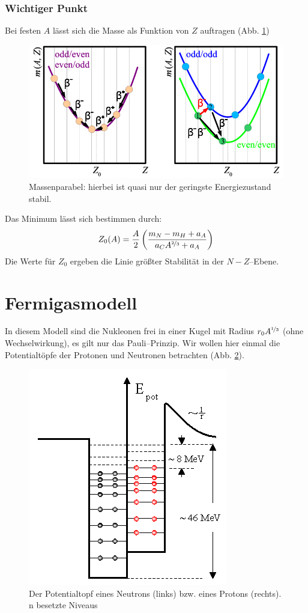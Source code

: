 \documentclass[Ex4_Zusammenfassung.tex]{subfiles}
\begin{document}
 \subsubsection*{Wichtiger Punkt}
 Bei festen $A$ lässt sich die Masse als Funktion von $Z$ auftragen (Abb. \ref{massenparabel})
 \begin{figure}[h]
 	\centering
 	\includegraphics[scale=0.5]{Doppelbeta-massenparabel.png}
 	\caption{Massenparabel: hierbei ist quasi nur der geringste Energiezustand stabil.}
 	\label{massenparabel}
 \end{figure}
 Das Minimum lässt sich bestimmen durch: 
 \begin{equation}
 	Z_0(A) = \frac{A}{2} \left( \frac{m_N - m_H + a_A}{a_C A^{\nicefrac{2}{3}} + a_A} \right) 
 \end{equation}
 Die Werte für $Z_0$ ergeben die Linie größter Stabilität in der $N-Z$--Ebene.
 
 \section{Fermigasmodell}
 In diesem Modell sind die Nukleonen frei in einer Kugel mit Radius $r_0 A^{\nicefrac{1}{3}}$ (ohne Wechselwirkung), es gilt nur das Pauli--Prinzip. Wir wollen hier einmal die Potentialtöpfe der Protonen und Neutronen betrachten (Abb. \ref{potentialtopf}).\\
 \begin{figure}[h]
 	\centering
 	\includegraphics[scale=0.5]{potentialtopf_pn.png}
 	\caption{Der Potentialtopf eines Neutrons (links) bzw. eines Protons (rechts). n besetzte Niveaus}
 	\label{potentialtopf}
 \end{figure}
\end{document}

